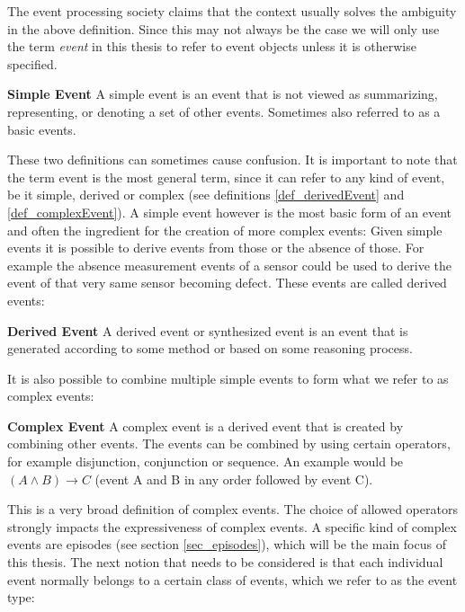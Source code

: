 The event processing society claims that the context usually solves the ambiguity in the above definition. Since this may not always be the case we will only use the term \textit{event} in this thesis to refer to event objects unless it is otherwise specified.

\begin{mydef}
\textbf{Simple Event} A simple event is an event that is not viewed as summarizing, representing, or denoting a set of other events. Sometimes also referred to as a basic events.
\end{mydef}

These two definitions can sometimes cause confusion. It is important to note that the term event is the most general term, since it can refer to any kind of event, be it simple, derived or complex (see definitions \ref{def_derivedEvent} and \ref{def_complexEvent}). A simple event however is the most basic form of an event and often the ingredient for the creation of more complex events:
Given simple events it is possible to derive events from those or the absence of those. For example the absence measurement events of a sensor could be used to derive the event of that very same sensor becoming defect. These events are called derived events:

\begin{mydef}
\label{def_derivedEvent}
\textbf{Derived Event} A derived event or synthesized event is an event that is generated according to some method or based on some reasoning process.
\end{mydef}

It is also possible to combine multiple simple events to form what we refer to as complex events:

\begin{mydef}
\label{def_complexEvent}
\textbf{Complex Event} A complex event is a derived event that is created by combining other events. The events can be combined by using certain operators, for example disjunction, conjunction or sequence. An example would be $(A \land B) \rightarrow C$ (event A and B in any order followed by event C).
\end{mydef}

This is a very broad definition of complex events. The choice of allowed operators strongly impacts the expressiveness of complex events. A specific kind of complex events are episodes (see section \ref{sec_episodes}), which will be the main focus of this thesis.
The next notion that needs to be considered is that each individual event normally belongs to a certain class of events, which we refer to as the event type:

